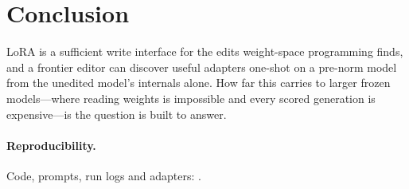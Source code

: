 \section{Conclusion}
\label{sec:conclusion}

LoRA is a sufficient write interface for the edits weight-space programming finds, and a frontier editor can discover
useful adapters one-shot on a pre-norm model from the unedited model's internals alone. How far this carries to larger
frozen models---where reading weights is impossible and every scored generation is expensive---is the question \lso{}
is built to answer. 

\paragraph{Reproducibility.} Code, prompts, run logs and adapters: .
